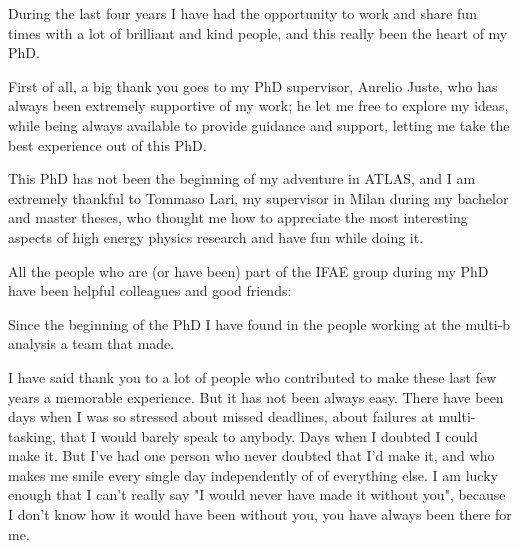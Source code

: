 During the last four years I have had the opportunity to work and share fun times with a lot 
of brilliant and kind people, and this really been the heart of my PhD. 

First of all, a big thank you goes to my PhD supervisor, Aurelio Juste, who has always been 
extremely supportive of my work; 
he let me free to explore my ideas, while being always available to provide guidance and support, 
letting me take the best experience out of this PhD. 

This PhD has not been the beginning of my adventure in ATLAS, and I am extremely thankful to 
Tommaso Lari, my supervisor in Milan during my bachelor and master theses,  
who thought me how to appreciate the most interesting aspects of high energy physics research 
and have fun while doing it.  

All the people who are (or have been) part of the IFAE group during my PhD have been helpful colleagues and 
good friends: 

Since the beginning of the PhD I have found in the people working at the multi-b analysis a team 
that made. 

I have said thank you to a lot of people who contributed to make these last few years a memorable experience. 
But it has not been always easy. There have been days when I was so stressed about missed deadlines, 
about failures at multi-tasking, that 
I would barely speak to anybody. 
Days when I doubted I could make it. 
But I've had one person who never doubted that I'd make it, and who makes me smile every single day independently 
of of everything else. 
I am lucky enough that I can't really say "I would never have made it without you", 
because I don't know how it would have been without you, you have always been there for me. 
